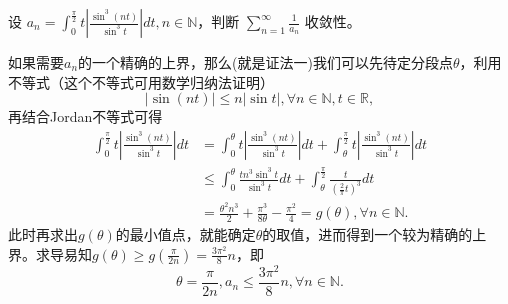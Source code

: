 \documentclass[../../main.tex]{subfiles}
\begin{document}
\begin{example}
设 \( a_n = \int_{0}^{\frac{\pi}{2}} t \left| \frac{\sin^3 (nt)}{\sin^3 t} \right| dt, n \in \mathbb{N} \)，判断 \( \sum_{n = 1}^{\infty} \frac{1}{a_n} \) 收敛性。
\end{example}
\begin{note}
如果需要$a_n$的一个精确的上界，那么(就是证法一)我们可以先待定分段点$\theta$，利用不等式（这个不等式可用数学归纳法证明）
\[
|\sin(nt)| \leqslant n|\sin t|, \forall n \in \mathbb{N}, t \in \mathbb{R},
\]
再结合Jordan不等式可得
\begin{align*}
\int_0^{\frac{\pi}{2}} t \left| \frac{\sin^3(nt)}{\sin^3 t} \right| dt &= \int_0^{\theta} t \left| \frac{\sin^3(nt)}{\sin^3 t} \right| dt + \int_{\theta}^{\frac{\pi}{2}} t \left| \frac{\sin^3(nt)}{\sin^3 t} \right| dt \\
&\leqslant \int_0^{\theta} \frac{t n^3 \sin^3 t}{\sin^3 t} dt + \int_{\theta}^{\frac{\pi}{2}} \frac{t}{\left( \frac{2}{\pi} t \right)^3} dt \\
&= \frac{\theta^2 n^3}{2} + \frac{\pi^3}{8 \theta} - \frac{\pi^2}{4} = g(\theta), \forall n \in \mathbb{N}.
\end{align*}
此时再求出$g(\theta)$的最小值点，就能确定$\theta$的取值，进而得到一个较为精确的上界。求导易知$g(\theta) \geqslant g\left( \frac{\pi}{2n} \right) = \frac{3\pi^2}{8} n$，即
\[
\theta = \frac{\pi}{2n}, a_n \leqslant \frac{3\pi^2}{8} n, \forall n \in \mathbb{N}.
\]
\end{note}
\end{document}
